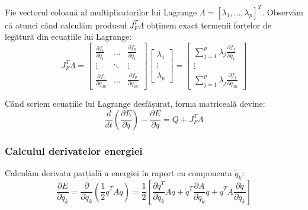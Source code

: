 \documentclass[12pt, a4paper]{article}
\begin{document}
Fie vectorul coloană al multiplicatorilor lui Lagrange $\Lambda = [\lambda_1, \dots, \lambda_p]^T$. Observăm că atunci când calculăm produsul $J_F^T \Lambda$ obținem exact termenii forțelor de legătură din ecuațiile lui Lagrange:
\begin{equation}
    J_F^T \Lambda = 
    \begin{bmatrix}
        \frac{\partial f_1}{\partial q_1} & \dots & \frac{\partial f_p}{\partial q_1} \\
        \vdots & \ddots & \vdots \\
        \frac{\partial f_1}{\partial q_{3n}} & \dots & \frac{\partial f_p}{\partial q_{3n}}
    \end{bmatrix}
    \begin{bmatrix}
        \lambda_1 \\ \vdots \\ \lambda_p
    \end{bmatrix}
    =
    \begin{bmatrix}
        \sum_{j=1}^p \lambda_j \frac{\partial f_j}{\partial q_1} \\
        \vdots \\
        \sum_{j=1}^p \lambda_j \frac{\partial f_j}{\partial q_{3n}}
    \end{bmatrix}
\end{equation}

Când scriem ecuațiile lui Lagrange desfășurat, forma matriceală devine:
\begin{equation}
    \frac{d}{dt}\left(\frac{\partial E}{\partial \dot{q}}\right) - \frac{\partial E}{\partial q} = Q + J_F^T \Lambda
\end{equation}

\subsubsection{Calculul derivatelor energiei}

Calculăm derivata parțială a energiei în raport cu componenta $\dot{q}_k$:
\begin{equation}
    \frac{\partial E}{\partial \dot{q}_k} = \frac{\partial}{\partial \dot{q}_k} \left( \frac{1}{2} \dot{q}^T A \dot{q} \right) = \frac{1}{2} \left[ \frac{\partial \dot{q}^T}{\partial \dot{q}_k} A \dot{q} + \dot{q}^T \frac{\partial A}{\partial \dot{q}_k} \dot{q} + \dot{q}^T A \frac{\partial \dot{q}}{\partial \dot{q}_k} \right]
\end{equation}
\end{document}
